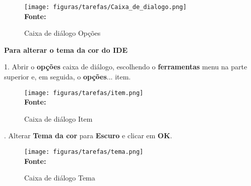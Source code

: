 \begin{figure}[ht!]
	\centering	
	\caption[\hspace{-0.1cm} Caixa de diálogo Opções]{Caixa de diálogo Opções}
	\vspace{-0.4cm}
	\texttt{[image: figuras/tarefas/Caixa\_de\_dialogo.png]}
	\vspace{-0.2cm}
	\\\textbf{\footnotesize Fonte:~\cite {tutorial_visual:14} }
	\label{fig:Caixa_de_diálogo_Opções}
	\vspace{-0.5cm}
\end{figure}

\textbf{Para alterar o tema da cor do IDE}

1. Abrir o \textbf{opções} caixa de diálogo, escolhendo o \textbf{ferramentas} menu na parte superior e, em seguida, o \textbf{opções}... item.

\begin{figure}[ht!]
	\centering	
	\caption[\hspace{-0.1cm} Caixa de diálogo Item]{Caixa de diálogo Item}
	\vspace{-0.4cm}
	\texttt{[image: figuras/tarefas/item.png]}
	\vspace{-0.1cm}
	\\\textbf{\footnotesize Fonte:~\cite {tutorial_visual:14} }
	\label{fig:Item}
	\vspace{-0.5cm}
\end{figure}

. Alterar \textbf{Tema da cor} para \textbf{Escuro} e clicar em \textbf{OK}.

\begin{figure}[ht!]
	\centering	
	\caption[\hspace{-0.1cm} Caixa de diálogo Tema]{Caixa de diálogo Tema}
	\vspace{-0.4cm}
	\texttt{[image: figuras/tarefas/tema.png]}
	\vspace{-0.1cm}
	\\\textbf{\footnotesize Fonte:~\cite {tutorial_visual:14} }
	\label{fig:tema}
	\vspace{-0.5cm}
\end{figure}

